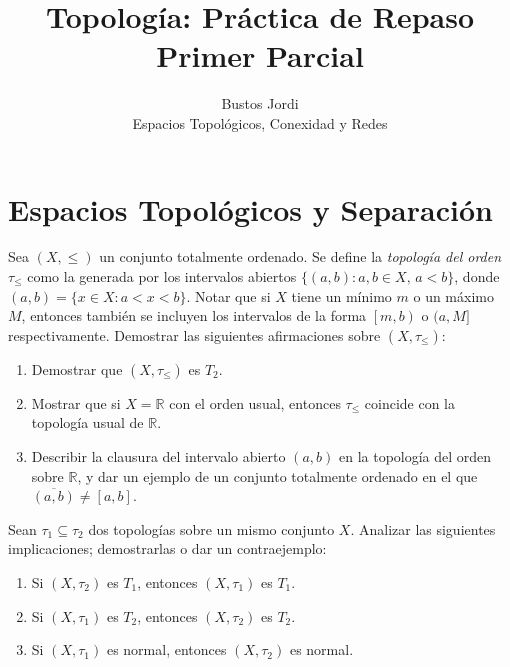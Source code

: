 \documentclass{article}
\theoremstyle{definition}
\newcommand{\R}{\mathbb{R}}
\newcommand{\cl}[1]{\overline{#1}}              %
\newcommand{\coint}[2]{\left[ #1, #2 \right)}
\newenvironment{ejercicio}[1]{\begin{trivlist}
\item[\hskip \labelsep {\bfseries Ejercicio}\hskip \labelsep {\bfseries #1.}]}{\end{trivlist}}
\begin{document}
\title{Topología: Práctica de Repaso\\Primer Parcial}
\author{Bustos Jordi\\Espacios Topológicos, Conexidad y Redes}

\maketitle

\section{Espacios Topológicos y Separación}

\begin{ejercicio}{1}
    Sea \((X, \leq)\) un conjunto totalmente ordenado. Se define la \textit{topología del orden} \(\tau_\leq \) como la generada por los intervalos abiertos
    \( \{ (a,b) : a, b \in X,\, a < b \} \), donde \( (a,b) = \{ x \in X : a < x < b \} \).
    Notar que si \( X \) tiene un mínimo \(m\) o un máximo \(M\), entonces también se incluyen los intervalos de la forma \(\coint{m}{b}\) o \( (a, M] \) respectivamente.
    Demostrar las siguientes afirmaciones sobre \((X, \tau_\leq)\):
    \begin{enumerate}
        \item Demostrar que \((X, \tau_\leq)\) es \(T_2\).
        \item Mostrar que si \(X = \R \) con el orden usual, entonces \(\tau_\leq \) coincide con la topología usual de \(\R \).
        \item Describir la clausura del intervalo abierto \((a,b)\) en la topología del orden sobre \(\R \), y dar un ejemplo de un conjunto totalmente ordenado en el que \(\cl{(a,b)} \neq [a,b]\).
    \end{enumerate}
\end{ejercicio}

\begin{ejercicio}{2}
    Sean \(\tau_1 \subseteq \tau_2\) dos topologías sobre un mismo conjunto \(X\). Analizar las siguientes implicaciones; demostrarlas o dar un contraejemplo:
    \begin{enumerate}
        \item Si \((X, \tau_2)\) es \(T_1\), entonces \((X, \tau_1)\) es \(T_1\).
        \item Si \((X, \tau_1)\) es \(T_2\), entonces \((X, \tau_2)\) es \(T_2\).
        \item Si \((X, \tau_1)\) es normal, entonces \((X, \tau_2)\) es normal.
    \end{enumerate}
\end{ejercicio}
\end{document}
